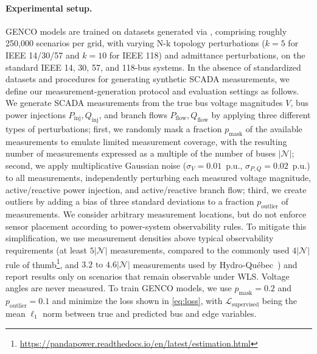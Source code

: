 \paragraph{Experimental setup.} GENCO models are trained on datasets generated via \datakit, comprising roughly 250{,}000 scenarios per grid, with varying N-k topology perturbations ($k=5$ for IEEE 14/30/57 and $k=10$ for IEEE 118) and admittance perturbations, on the standard IEEE 14, 30, 57, and 118-bus systems. In the absence of standardized datasets and procedures for generating synthetic SCADA measurements, we define our measurement-generation protocol and evaluation settings as follows. We generate SCADA measurements from the true bus voltage magnitudes $V$, bus power injections $P_{\text{inj}}, Q_{\text{inj}}$, and branch flows $P_{\text{flow}}, Q_{\text{flow}}$ by applying three different types of perturbations; first, we randomly mask a fraction $p_{\text{mask}}$ of the available measurements to emulate limited measurement coverage, with the resulting number of measurements expressed as a multiple of the number of buses $|\mathcal{N}|$; second, we apply multiplicative Gaussian noise ($\sigma_V = 0.01$~p.u., $\sigma_{P,Q} = 0.02$~p.u.) to all measurements, independently perturbing each measured voltage magnitude, active/reactive power injection, and active/reactive branch flow; third, we create outliers by adding a bias of three standard deviations to a fraction $p_{\text{outlier}}$ of measurements. We consider arbitrary measurement locations, but do not enforce sensor placement according to power-system observability rules. To mitigate this simplification, we use measurement densities above typical observability requirements (at least $5|\mathcal{N}|$ measurements, compared to the commonly used $4|\mathcal{N}|$ rule of thumb\footnote{\url{https://pandapower.readthedocs.io/en/latest/estimation.html}}, and $3.2 \text{ to } 4.6|\mathcal{N}|$ measurements used by Hydro-Québec~\cite{4596318}) and report results only on scenarios that remain observable under WLS. Voltage angles are never measured. To train GENCO models, we use $p_{\text{mask}} = 0.2$ and $p_{\text{outlier}} = 0.1$ and minimize the loss shown in \cref{eq:loss}, with $\mathcal{L}_{\text{supervised}}$ being the mean $\ell_1$ norm between true and predicted bus and edge variables.



